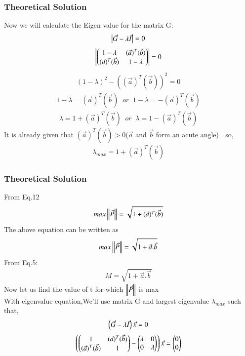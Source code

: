 \documentclass{beamer}
\begin{document}
\begin{frame}
\frametitle{Theoretical Solution}
   Now we will calculate the Eigen value for the matrix G:
\begin{align}
    \begin{vmatrix}\Vec{G}-\lambda \Vec{I}\end{vmatrix}=0
\end{align}
\begin{align}
    \begin{vmatrix}\begin{pmatrix}1-\lambda&(\Vec{a})^T(\Vec{b})\\(\Vec{a})^T(\Vec{b})&1-\lambda\end{pmatrix}\end{vmatrix}=0
\end{align}
\begin{align}
    (1-\lambda)^2-((\Vec{a})^T(\Vec{b}))^2=0
\end{align}
\begin{align}
    1-\lambda=(\Vec{a})^T(\Vec{b})\;\;or\;\;1-\lambda=-(\Vec{a})^T(\Vec{b})
\end{align}
\begin{align}
    \lambda=1+(\Vec{a})^T(\Vec{b})\;\;or \;\;\lambda=1-(\Vec{a})^T(\Vec{b})
\end{align}
It is already given that $(\Vec{a})^T(\Vec{b})>0 $($\Vec{a}$ and $\Vec{b}$ form an acute angle) . so,
\begin{align}
 \lambda_{max}=1+  (\Vec{a})^T(\Vec{b}) 
\end{align}


\end{frame}
\begin{frame}
\frametitle{Theoretical Solution}
  From Eq.12
\begin{align}
    max\left\lVert\Vec{P}\right\rVert=\sqrt{1+  (\Vec{a})^T(\Vec{b}) }
\end{align}
The above equation can be written as
\begin{align}
   max \left\lVert\Vec{P}\right\rVert=\sqrt{1+\Vec{a}.\Vec{b}}
\end{align}
From Eq.5:
\begin{align}
    M=\sqrt{1+\Vec{a}.\Vec{b}}
\end{align}
Now let us find the value of t for which $\left\lVert\Vec{P}\right\rVert$ is max\\
With eigenvalue equation,We'll use matrix G and largest eigenvalue $\lambda_{max}$ such that,
\begin{align}
    \begin{pmatrix}\Vec{G}-\lambda \Vec{I}\end{pmatrix}\Vec{x}=0
\end{align}
\begin{align}
    \left(\begin{pmatrix}1&(\Vec{a})^T(\Vec{b})\\(\Vec{a})^T(\Vec{b})&1\end{pmatrix}-\begin{pmatrix}\lambda&0\\0&\lambda\end{pmatrix}\right)\Vec{x}=\begin{pmatrix}0\\0\end{pmatrix}
\end{align}

\end{frame}
\end{document}
